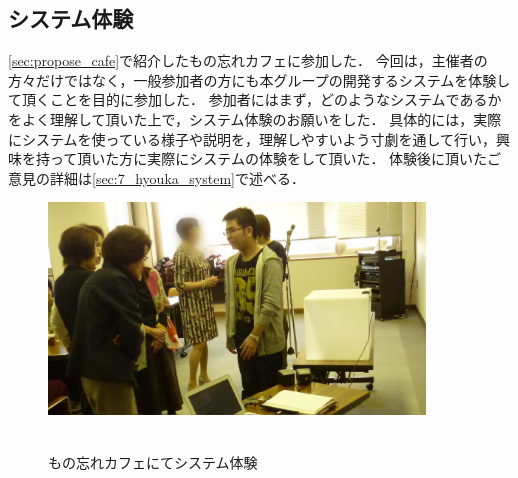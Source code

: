 \documentclass[../report]{subfiles}
\begin{document}
\subsection{システム体験}
\ref{sec:propose_cafe}で紹介したもの忘れカフェに参加した．
今回は，主催者の方々だけではなく，一般参加者の方にも本グループの開発するシステムを体験して頂くことを目的に参加した．
参加者にはまず，どのようなシステムであるかをよく理解して頂いた上で，システム体験のお願いをした．
具体的には，実際にシステムを使っている様子や説明を，理解しやすいよう寸劇を通して行い，興味を持って頂いた方に実際にシステムの体験をして頂いた．
体験後に頂いたご意見の詳細は\ref{sec:7_hyouka_system}で述べる．
\begin{figure}[htbp]
    \begin{center}
        \includegraphics[width=10cm]{imgs/2_system_taiken.jpg}
        \caption{もの忘れカフェにてシステム体験}
    \end{center}
\end{figure}
\end{document}
